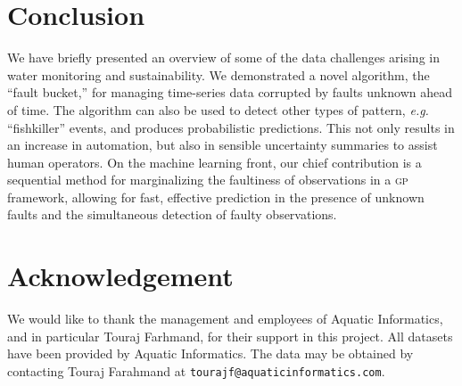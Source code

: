 \documentclass{article}
\newcommand{\acro}[1]{\textsc{#1}}
\begin{document}
\section{Conclusion}
We have briefly presented an overview of some of the data challenges arising in water monitoring and sustainability. We demonstrated a novel algorithm, the ``fault bucket,'' for managing
time-series data corrupted by faults unknown ahead of time. The algorithm can also be used to detect other types of pattern, \emph{e.g.} ``fishkiller'' events, and produces probabilistic predictions. This not only results in an increase in automation, but also in sensible uncertainty summaries to assist human operators. On the machine learning front, our chief
contribution is a sequential method for marginalizing the
faultiness of observations in a \acro{gp} framework, allowing for
fast, effective prediction in the presence of unknown faults and the
simultaneous detection of faulty observations.

\section*{Acknowledgement}
We would like to thank the management and employees of Aquatic Informatics, and in particular Touraj Farhmand, for their support in this project.
All datasets have been provided by Aquatic Informatics. The data may
be obtained by contacting Touraj Farahmand at
\texttt{tourajf@aquaticinformatics.com}.




\end{document}
